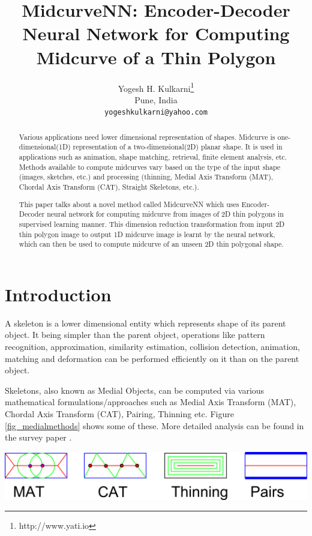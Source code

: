 \documentclass{article}
\title{MidcurveNN: Encoder-Decoder Neural Network for Computing Midcurve of a Thin Polygon}
\author{
  Yogesh H. Kulkarni\thanks{http://www.yati.io} \\
  Pune, India\\
  \texttt{yogeshkulkarni@yahoo.com} \\
}
\begin{document}
\maketitle

\begin{abstract}
Various applications need lower dimensional representation of shapes. Midcurve is one-dimensional(1D) representation of a two-dimensional(2D) planar shape. It is used in applications such as animation, shape matching, retrieval, finite element analysis, etc. Methods available to compute midcurves vary based on the type of the input shape (images, sketches, etc.) and processing (thinning, Medial Axis Transform (MAT), Chordal Axis Transform (CAT), Straight Skeletons, etc.).

This paper talks about a novel method called MidcurveNN which uses Encoder-Decoder neural network for computing midcurve from images of 2D thin polygons in supervised learning manner. This dimension reduction transformation from input 2D thin polygon image to output 1D midcurve image is learnt by the neural network, which can then be used to compute midcurve of an unseen 2D thin polygonal shape. 
\end{abstract}



\section{Introduction}
A skeleton is a lower dimensional entity which represents shape of its parent object. It being simpler than the parent object, operations like pattern recognition, approximation, similarity estimation, collision detection, animation, matching and deformation can be performed efficiently on it than on the parent object. 

Skeletons, also known as Medial Objects, can be computed via various mathematical formulations/approaches such as Medial Axis Transform (MAT), Chordal Axis Transform (CAT), Pairing, Thinning etc. Figure \ref{fig_medialmethods} shows some of these. More detailed analysis can be found in the survey paper \cite{medial2010}.

    \begin{center}
	\includegraphics[width=0.6\linewidth]{images/MedialMethodsOnlyShort}
	\label{fig_medialmethods}
    \end{center}
    
\end{document}
